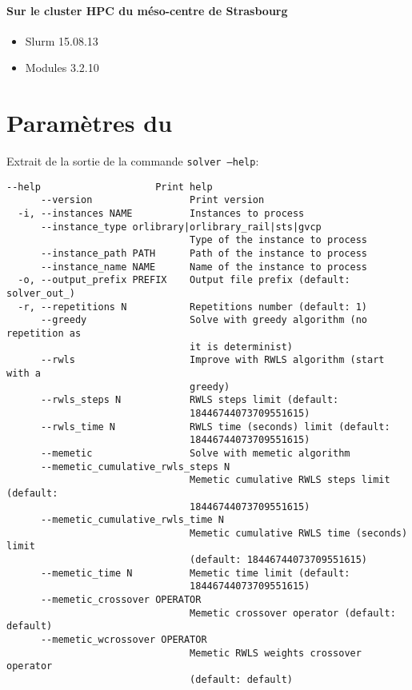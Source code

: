 \documentclass[a4paper,11pt,twoside,french,report]{../common/simplem}
\begin{document}
			\paragraph*{Sur le cluster \gls{HPC} du méso-centre de Strasbourg}
				\begin{itemize}
					\item Slurm 15.08.13
					\item Modules 3.2.10
				\end{itemize}
		\newpage\section{Paramètres du \solver{}}\label{sec:solver_parameters}
			Extrait de la sortie de la commande \texttt{solver --help}:
			\begin{Verbatim}[frame=single]
      --help                    Print help
      --version                 Print version
  -i, --instances NAME          Instances to process
      --instance_type orlibrary|orlibrary_rail|sts|gvcp
                                Type of the instance to process
      --instance_path PATH      Path of the instance to process
      --instance_name NAME      Name of the instance to process
  -o, --output_prefix PREFIX    Output file prefix (default: solver_out_)
  -r, --repetitions N           Repetitions number (default: 1)
      --greedy                  Solve with greedy algorithm (no repetition as
                                it is determinist)
      --rwls                    Improve with RWLS algorithm (start with a
                                greedy)
      --rwls_steps N            RWLS steps limit (default:
                                18446744073709551615)
      --rwls_time N             RWLS time (seconds) limit (default:
                                18446744073709551615)
      --memetic                 Solve with memetic algorithm
      --memetic_cumulative_rwls_steps N
                                Memetic cumulative RWLS steps limit (default:
                                18446744073709551615)
      --memetic_cumulative_rwls_time N
                                Memetic cumulative RWLS time (seconds) limit
                                (default: 18446744073709551615)
      --memetic_time N          Memetic time limit (default:
                                18446744073709551615)
      --memetic_crossover OPERATOR
                                Memetic crossover operator (default: default)
      --memetic_wcrossover OPERATOR
                                Memetic RWLS weights crossover operator
                                (default: default)
			\end{Verbatim}
\end{document}
